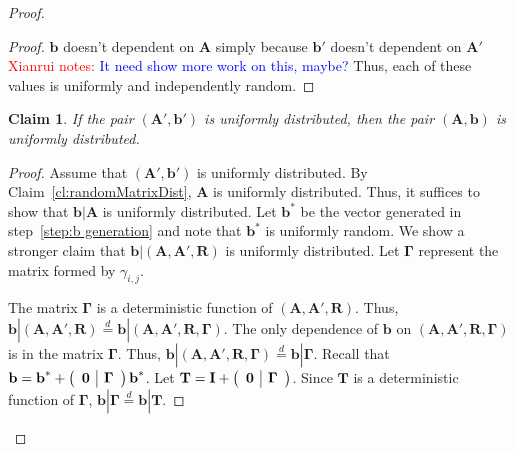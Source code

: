 \documentclass[11pt]{article}
\newcommand{\clref}[1]{\mbox{Claim~\ref{#1}}}
\newcommand{\class}[1]{{\ensuremath{\mathsf{#1}}}}
\newcommand{\vect}[1]{\ensuremath{\textbf{#1}}}
\newcommand{\Fq}{\ensuremath{\mathbb{F}_q}}
\newcommand{\LWE}{\class{LWE}}
\newtheorem{claim}[theorem]{Claim}
\newcommand{\authnote}[2]{{\textcolor{red}{\textsf{#1 notes: }\textcolor{blue}{ #2}}\marginpar{\textcolor{red}{\textbf{!!!!!}}}}}
\newcommand{\authnote}[2]{}
\newcommand{\xnote}[1]{{\authnote{Xianrui}{#1}}}
\newcommand{\ve}{\vect{e}}
\newcommand{\vA}{\vect{A}}
\newcommand{\vR}{\vect{R}}
\newcommand{\vT}{\vect{T}}
\newcommand{\vx}{\vect{x}}
\newcommand{\va}{\vect{a}}
\newcommand{\vb}{\vect{b}}
\newcommand{\vgamma}{\mathbf{\Gamma}}
\newcommand{\vu}{\vect{u}}
\begin{document}
{\begin{proof}
\begin{proof}
$\vb$ doesn't dependent on $\vA$ simply because $\vb'$ doesn't dependent on $\vA'$ \xnote{It need show more work on this, maybe?}
Thus, each of these values is uniformly and independently random.
\end{proof}

%

\begin{claim}
If the pair $(\vA', \vb')$ is uniformly distributed, then the pair $(\vA, \vb)$ is uniformly distributed.
\end{claim}
\begin{proof}
Assume that $(\vA', \vb')$ is uniformly distributed.  By \clref{cl:randomMatrixDist}, $\vA$ is uniformly distributed.  Thus, it suffices to show that $\vb | \vA$ is uniformly distributed.  Let $\vb^*$ be the vector generated in step~\ref{step:b generation} and note that $\vb^*$ is uniformly random.  
We show  a stronger claim that $\vb |( \vA, \vA', \vR)$ is uniformly distributed.  Let $\vgamma$ represent the matrix formed by $\gamma_{i,j}$.  
 
 The matrix $\vgamma$ is a deterministic function of $(\vA, \vA', \vR)$.  Thus, $\vb | (\vA, \vA', \vR) \overset{d}= \vb | (\vA, \vA', \vR, \vgamma)$.  The only dependence of $\vb$ on $(\vA, \vA', \vR, \vgamma)$ is in the matrix $\vgamma$.  Thus, $ \vb | (\vA, \vA', \vR, \vgamma) \overset{d}= \vb | \vgamma$. Recall that $\vb = \vb^* +  \left(\begin{array}{c | c}\mathbf{0} &\vgamma\end{array}\right)\vb^*$.  Let $\vT = \vect{I}+  \left(\begin{array}{c | c}\mathbf{0} & \vgamma \end{array}\right)$.  Since $\vT$ is a deterministic function of $\vgamma$, $\vb | \vgamma \overset{d} = \vb | \vT$.
 

\end{proof}
\end{proof}}
\end{document}
